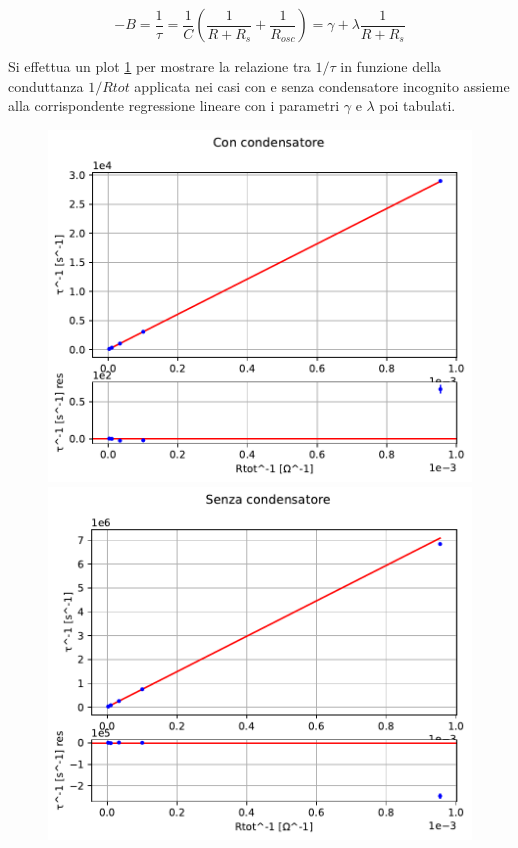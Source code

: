 \documentclass{article}
\begin{document}
\begin{equation}
	-B=\frac{1}{\tau}=\frac{1}{C} \left( \frac{1}{R+R_s} + \frac{1}{R_{osc}} \right) = \gamma + \lambda \frac{1}{R+R_s}
\end{equation}

Si effettua un plot \ref{fig:fit1} per mostrare la relazione tra $1/\tau$ in funzione della conduttanza $1/Rtot$ applicata nei casi con e senza condensatore incognito assieme alla corrispondente regressione lineare con i parametri $\gamma$ e $\lambda$ poi tabulati.

\begin{figure}[h]
	\centering
	 \begin{minipage}{0.5\textwidth}
	     \centering
	     \includegraphics[width=\textwidth]{figfit.pdf}
	 \end{minipage}\hfill
	 \begin{minipage}{0.5\textwidth}
	     \centering
	     \includegraphics[width=\textwidth]{figfit1.pdf} 
	 \end{minipage}
	 \label{fig:fit1}
\end{figure}
\end{document}
